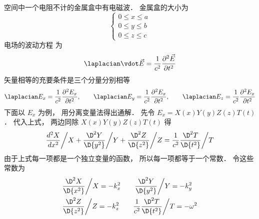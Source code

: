 
空间中一个电阻不计的金属盒中有电磁波．
金属盒的大小为 
\begin{equation}
\left\{ \begin{array}{l}
0 \le x \le a\\
0 \le y \le b\\
0 \le z \le c
\end{array} \right.
\end{equation} 
电场的波动方程%
为
\begin{equation}
{\laplacian} \vdot \vec E = \frac{1}{{{c^2}}}\frac{{{\partial ^2}\vec E}}{{\partial {t^2}}}
\end{equation}  
矢量相等的充要条件是三个分量分别相等
\begin{equation}
{\laplacian}{E_x} = \frac{1}{{{c^2}}}\frac{{{\partial ^2}{E_x}}}{{\partial {t^2}}},
\qquad
{\laplacian}{E_y} = \frac{1}{{{c^2}}}\frac{{{\partial ^2}{E_x}}}{{\partial {t^2}}},
\qquad
{\laplacian}{E_z} = \frac{1}{{{c^2}}}\frac{{{\partial ^2}{E_x}}}{{\partial {t^2}}}
\end{equation}   
下面以 $E_x$ 为例， 用分离变量法得出通解．
先令 ${E_x} = X\left( x \right)Y\left( y \right)Z\left( z \right)T\left( t \right)$． 代入上式， 两边同除 $X\left( x \right)Y\left( y \right)Z\left( z \right)T\left( t \right)$ 得
\begin{equation}
{{\frac{{{d^2}X}}{{d{x^2}}}} \mathord{\left/
 {\vphantom {{\frac{{{\D ^2}X}}{{\D {x^2}}}} X}} \right.
 \kern-\nulldelimiterspace} X} + {{\frac{{{\D ^2}Y}}{{\D {y^2}}}} \mathord{\left/
 {\vphantom {{\frac{{{\D ^2}Y}}{{\D {y^2}}}} Y}} \right.
 \kern-\nulldelimiterspace} Y} + {{\frac{{{\D ^2}Z}}{{\D {z^2}}}} \mathord{\left/
 {\vphantom {{\frac{{{\D ^2}Z}}{{\D {z^2}}}} Z}} \right.
 \kern-\nulldelimiterspace} Z} = \frac{1}{{{c^2}}}{{\frac{{{\D ^2}T}}{{\D {t^2}}}} \mathord{\left/
 {\vphantom {{\frac{{{\D ^2}T}}{{\D {t^2}}}} T}} \right.
 \kern-\nulldelimiterspace} T}
\end{equation} 
由于上式每一项都是一个独立变量的函数， 所以每一项都等于一个常数． 令这些常数为
\begin{equation}\begin{aligned}
&{{\frac{{{\D ^2}X}}{{\D {x^2}}}} \mathord{\left/
 {\vphantom {{\frac{{{\D ^2}X}}{{\D {x^2}}}} X}} \right.
 \kern-\nulldelimiterspace} X} =  - k_x^2 \qquad {{\frac{{{\D ^2}Y}}{{\D {y^2}}}} \mathord{\left/
 {\vphantom {{\frac{{{\D ^2}Y}}{{\D {y^2}}}} Y}} \right.
 \kern-\nulldelimiterspace} Y} =  - k_y^2\\
 &{{\frac{{{\D ^2}Z}}{{\D {z^2}}}} \mathord{\left/
 {\vphantom {{\frac{{{\D ^2}Z}}{{\D {z^2}}}} Z}} \right.
 \kern-\nulldelimiterspace} Z} =  - k_z^2 \qquad \frac{1}{{{c^2}}}{{\frac{{{\D ^2}T}}{{\D {t^2}}}} \mathord{\left/
 {\vphantom {{\frac{{{\D ^2}T}}{{\D {t^2}}}} T}} \right.
 \kern-\nulldelimiterspace} T} =  - {\omega ^2}
\end{aligned}\end{equation} 
